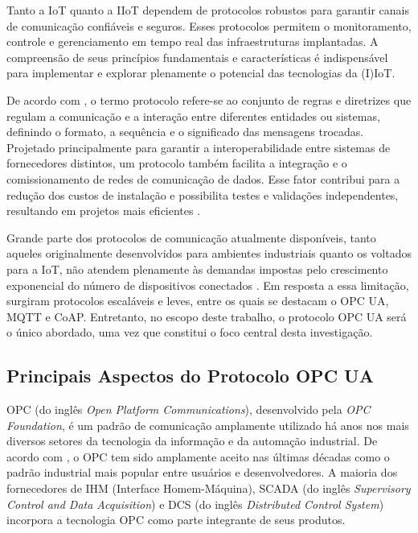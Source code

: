     Tanto a IoT quanto a IIoT dependem de protocolos robustos para garantir canais de comunicação confiáveis e seguros. Esses protocolos permitem o monitoramento, controle e gerenciamento em tempo real das infraestruturas implantadas. A compreensão de seus princípios fundamentais e características é indispensável para implementar e explorar plenamente o potencial das tecnologias da (I)IoT.

    De acordo com , o termo protocolo refere-se ao conjunto de regras e diretrizes que regulam a comunicação e a interação entre diferentes entidades ou sistemas, definindo o formato, a sequência e o significado das mensagens trocadas. Projetado principalmente para garantir a interoperabilidade entre sistemas de fornecedores distintos, um protocolo também facilita a integração e o comissionamento de redes de comunicação de dados. Esse fator contribui para a redução dos custos de instalação e possibilita testes e validações independentes, resultando em projetos mais eficientes \cite{mohagheghi2009}.

    Grande parte dos protocolos de comunicação atualmente disponíveis, tanto aqueles originalmente desenvolvidos para ambientes industriais quanto os voltados para a IoT, não atendem plenamente às demandas impostas pelo crescimento exponencial do número de dispositivos conectados \cite{markel2017}. Em resposta a essa limitação, surgiram protocolos escaláveis e leves, entre os quais se destacam o OPC UA, MQTT e CoAP. Entretanto, no escopo deste trabalho, o protocolo OPC UA será o único abordado, uma vez que constitui o foco central desta investigação.
        
    \subsection{Principais Aspectos do Protocolo OPC UA} \label{subsec:opcUA}

        OPC (do inglês \textit{Open Platform Communications}), desenvolvido pela \textit{OPC Foundation}, é um padrão de comunicação amplamente utilizado há anos nos mais diversos setores da tecnologia da informação e da automação industrial. De acordo com , o OPC tem sido amplamente aceito nas últimas décadas como o padrão industrial mais popular entre usuários e desenvolvedores. A maioria dos fornecedores de IHM (Interface Homem-Máquina), SCADA (do inglês \textit{Supervisory Control and Data Acquisition}) e DCS (do inglês \textit{Distributed Control System}) incorpora a tecnologia OPC como parte integrante de seus produtos.

